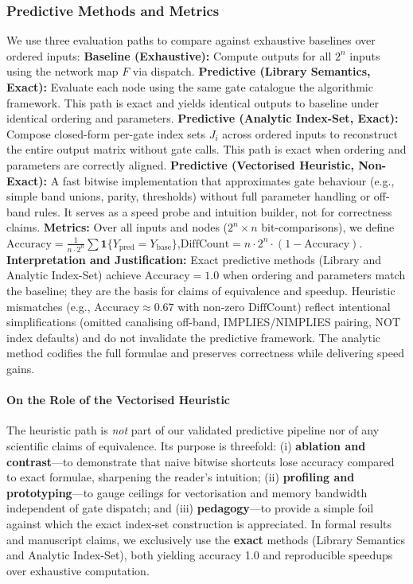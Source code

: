 \subsubsection{Predictive Methods and Metrics}
We use three evaluation paths to compare against exhaustive baselines over ordered inputs:
\textbf{Baseline (Exhaustive):} Compute outputs for all \(2^n\) inputs using the network map \(F\) via dispatch.
\textbf{Predictive (Library Semantics, Exact):} Evaluate each node using the same gate catalogue the algorithmic framework. This path is exact and yields identical outputs to baseline under identical ordering and parameters.
\textbf{Predictive (Analytic Index-Set, Exact):} Compose closed-form per-gate index sets \(J_i\) across ordered inputs to reconstruct the entire output matrix without gate calls. This path is exact when ordering and parameters are correctly aligned.
\textbf{Predictive (Vectorised Heuristic, Non-Exact):} A fast bitwise implementation that approximates gate behaviour (e.g., simple band unions, parity, thresholds) without full parameter handling or off-band rules. It serves as a speed probe and intuition builder, not for correctness claims.
\textbf{Metrics:} Over all inputs and nodes (\(2^n\times n\) bit-comparisons), we define
\(\mathrm{Accuracy}=\frac{1}{n\cdot 2^n}\sum \mathbf{1}\{Y_{\mathrm{pred}}=Y_{\mathrm{base}}\}\),\quad \(\mathrm{DiffCount}=n\cdot 2^n \cdot (1-\mathrm{Accuracy})\).
\textbf{Interpretation and Justification:} Exact predictive methods (Library and Analytic Index-Set) achieve \(\mathrm{Accuracy}=1.0\) when ordering and parameters match the baseline; they are the basis for claims of equivalence and speedup. Heuristic mismatches (e.g., \(\mathrm{Accuracy}\approx 0.67\) with non-zero \(\mathrm{DiffCount}\)) reflect intentional simplifications (omitted canalising off-band, IMPLIES/NIMPLIES pairing, NOT index defaults) and do not invalidate the predictive framework. The analytic method codifies the full formulae and preserves correctness while delivering speed gains.
\paragraph{On the Role of the Vectorised Heuristic}
The heuristic path is \emph{not} part of our validated predictive pipeline nor of any scientific claims of equivalence. Its purpose is threefold: (i) \textbf{ablation and contrast}—to demonstrate that naive bitwise shortcuts lose accuracy compared to exact formulae, sharpening the reader’s intuition; (ii) \textbf{profiling and prototyping}—to gauge ceilings for vectorisation and memory bandwidth independent of gate dispatch; and (iii) \textbf{pedagogy}—to provide a simple foil against which the exact index-set construction is appreciated. In formal results and manuscript claims, we exclusively use the \textbf{exact} methods (Library Semantics and Analytic Index-Set), both yielding accuracy 1.0 and reproducible speedups over exhaustive computation.
